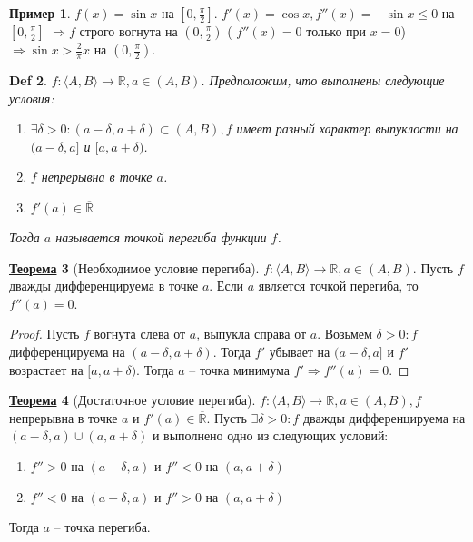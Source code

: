\documentclass[12pt]{article}
\newenvironment{MyList}[1][4pt]{
  \begin{enumerate}[1.]
  \setlength{\parskip}{0pt}
  \setlength{\itemsep}{#1}
}{       
  \end{enumerate}
}
\def\R{\mathbb{R}}       %
\def\SO{\Rightarrow}     %
\theoremstyle{definition} %
\newtheorem{Thm}{\underline{Теорема}}[subsection] %
\newtheorem{Example}[Thm]{Пример} %
\theoremstyle{plain} %
\newtheorem{Def}[Thm]{Def} %
\theoremstyle{remark} %
\begin{document}
\begin{Example}
    $f(x) = \sin x$ на $\left[0, \frac{\pi}{2}\right]$. $f'(x) = \cos x, f''(x) = -\sin x \leqslant 0$ на $\left[0, \frac{\pi}{2}\right]$
    $\SO f$ строго вогнута на $\left(0, \frac{\pi}{2}\right)$ ( $f''(x) = 0$ только при $x = 0$) $\SO \sin x > \frac{2}{\pi} x$ на $\left(0, \frac{\pi}{2}\right)$.  
\end{Example}

\begin{Def}
    $f : \langle A, B\rangle \to \R, a \in (A, B)$. Предположим, что выполнены следующие условия:
    \begin{MyList}
        \item $\exists \delta > 0 : (a - \delta, a + \delta) \subset (A, B), f$ имеет разный характер выпуклости на $(a - \delta, a]$ и $[a, a + \delta)$.
        \item $f$ непрерывна в точке $a$.
        \item $f'(a) \in \overline{\R}$
    \end{MyList}
    Тогда $a$ называется точкой перегиба функции $f$.
\end{Def}

\begin{Thm}[Необходимое условие перегиба]
    $f : \langle A, B\rangle \to \R, a \in (A, B)$. Пусть $f$ дважды дифференцируема в точке $a$. 
    Если $a$ является точкой перегиба, то $f''(a) = 0$.    
\end{Thm}

\begin{proof}
    Пусть $f$ вогнута слева от $a$, выпукла справа от $a$. Возьмем $\delta > 0 : f$ дифференцируема на $(a - \delta, a + \delta)$.
    Тогда $f'$ убывает на $(a - \delta, a]$ и $f'$ возрастает на $[a, a + \delta)$. Тогда $a$ -- точка минимума $f' \SO f''(a) = 0$.
\end{proof}

\begin{Thm}[Достаточное условие перегиба]
    $f : \langle A, B\rangle \to \R, a \in (A, B), f$ непрерывна в точке $a$ и $f'(a) \in \overline{\R}$.
    Пусть $\exists \delta > 0 : f$ дважды дифференцируема на $(a - \delta, a) \cup (a, a + \delta)$ и выполнено одно из следующих условий:
    \begin{MyList}
        \item $f'' > 0$ на $(a - \delta, a)$ и $f'' < 0$ на $(a, a + \delta)$ 
        \item $f'' < 0$ на $(a - \delta, a)$ и $f'' > 0$ на $(a, a + \delta)$   
    \end{MyList}     
    Тогда $a$ -- точка перегиба.
\end{Thm}
\end{document}
